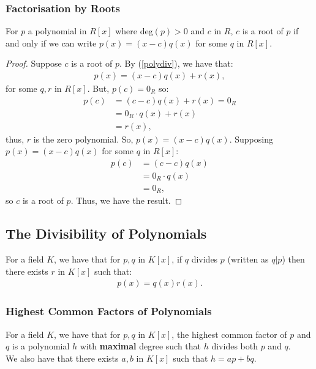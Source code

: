 \newpage

\subsubsection{Factorisation by Roots}

For $p$ a polynomial in $R[x]$ where deg$(p) > 0$ and $c$ in $R$, $c$ is a
root of $p$ if and only if we can write $p(x) = (x - c)q(x)$ for some
$q$ in $R[x]$.
\begin{proof}
    Suppose $c$ is a root of $p$. By (\ref{polydiv}), we have that: \begin{gather*}
        p(x) = (x - c)q(x) + r(x),
    \end{gather*} for some $q, r$ in $R[x]$. But, $p(c) = 0_R$ so: \begin{align*}
        p(c) &= (c - c)q(x) + r(x) = 0_R \\
        &= 0_R \cdot q(x) + r(x) \\
        &= r(x),
    \end{align*} thus, $r$ is the zero polynomial. So, $p(x) = (x - c)q(x)$.
    Supposing $p(x) = (x - c)q(x)$ for some $q$ in $R[x]$: \begin{align*}
        p(c) &= (c - c)q(x) \\
        &= 0_R \cdot q(x) \\
        &= 0_R,
    \end{align*} so $c$ is a root of $p$. Thus, we have the result.
\end{proof}

\subsection{The Divisibility of Polynomials}

For a field $K$, we have that for $p, q$ in $K[x]$, if $q$ divides $p$ (written as $q | p$)
then there exists $r$ in $K[x]$ such that: \begin{gather*}
  p(x) = q(x)r(x).
\end{gather*}

\subsubsection{Highest Common Factors of Polynomials}

For a field $K$, we have that for $p, q$ in $K[x]$, the highest common factor of $p$ and $q$
is a polynomial $h$ with \textbf{maximal} degree such that $h$ divides both $p$ and $q$.
\\[\baselineskip]
We also have that there exists $a, b$ in $K[x]$ such that $h = ap + bq$.

